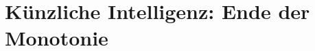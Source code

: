 \documentclass[../Mappe.tex]{subfiles}
\begin{document}
\section{Künzliche Intelligenz: Ende der Monotonie}
\end{document}
